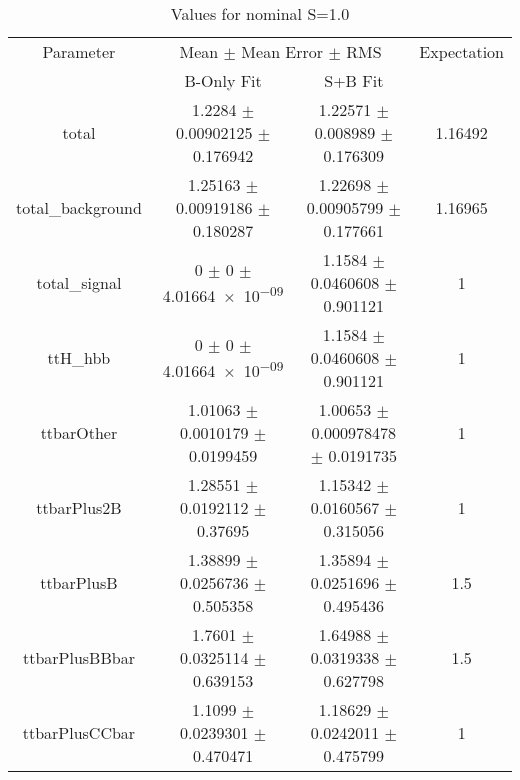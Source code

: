 \begin{table}
\centering
\caption{Values for nominal S=1.0}
\begin{tabular}{cccc}
\toprule
Parameter & \multicolumn{2}{c}{Mean $\pm$ Mean Error $\pm$ RMS} & Expectation\\
 & B-Only Fit & S+B Fit & \\
\midrule
total & \num{1.2284} $\pm$ \num{0.00902125} $\pm$ \num{0.176942} & \num{1.22571} $\pm$ \num{0.008989} $\pm$ \num{0.176309} & \num{1.16492}\\
total\_background & \num{1.25163} $\pm$ \num{0.00919186} $\pm$ \num{0.180287} & \num{1.22698} $\pm$ \num{0.00905799} $\pm$ \num{0.177661} & \num{1.16965}\\
total\_signal & \num{0} $\pm$ \num{0} $\pm$ \num{4.01664e-09} & \num{1.1584} $\pm$ \num{0.0460608} $\pm$ \num{0.901121} & \num{1}\\
ttH\_hbb & \num{0} $\pm$ \num{0} $\pm$ \num{4.01664e-09} & \num{1.1584} $\pm$ \num{0.0460608} $\pm$ \num{0.901121} & \num{1}\\
ttbarOther & \num{1.01063} $\pm$ \num{0.0010179} $\pm$ \num{0.0199459} & \num{1.00653} $\pm$ \num{0.000978478} $\pm$ \num{0.0191735} & \num{1}\\
ttbarPlus2B & \num{1.28551} $\pm$ \num{0.0192112} $\pm$ \num{0.37695} & \num{1.15342} $\pm$ \num{0.0160567} $\pm$ \num{0.315056} & \num{1}\\
ttbarPlusB & \num{1.38899} $\pm$ \num{0.0256736} $\pm$ \num{0.505358} & \num{1.35894} $\pm$ \num{0.0251696} $\pm$ \num{0.495436} & \num{1.5}\\
ttbarPlusBBbar & \num{1.7601} $\pm$ \num{0.0325114} $\pm$ \num{0.639153} & \num{1.64988} $\pm$ \num{0.0319338} $\pm$ \num{0.627798} & \num{1.5}\\
ttbarPlusCCbar & \num{1.1099} $\pm$ \num{0.0239301} $\pm$ \num{0.470471} & \num{1.18629} $\pm$ \num{0.0242011} $\pm$ \num{0.475799} & \num{1}\\
\bottomrule
\end{tabular}
\end{table}